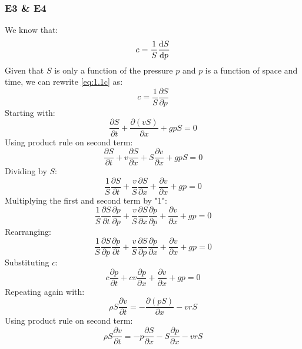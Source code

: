 \documentclass[11pt]{article}
\numberwithin{equation}{section}
\begin{document}
\subsubsection{E3 \& E4}
We know that:
\begin{equation}
    c = \frac{1}{S}\frac{\dif S}{\dif p} \label{eq:1.1c}
\end{equation}
Given that $S$ is only a function of the pressure $p$ and $p$ is a function of space and time, we can rewrite \ref{eq:1.1c} as:
\begin{equation}
    c = \frac{1}{S}\frac{\partial S}{\partial p}
\end{equation}
Starting with:
\begin{equation}
    \frac{\partial S}{\partial t} + \frac{\partial \left(vS\right)}{\partial x} + gpS = 0
\end{equation}
Using product rule on second term:
\begin{equation}
    \frac{\partial S}{\partial t} + v\frac{\partial S}{\partial x} + S \frac{\partial v}{\partial x} + gpS = 0
\end{equation}
Dividing by $S$:
\begin{equation}
    \frac{1}{S}\frac{\partial S}{\partial t} + \frac{v}{S} \frac{\partial S}{\partial x} + \frac{\partial v}{\partial x} + gp = 0
\end{equation}
Multiplying the first and second term by "1":
\begin{equation}
    \frac{1}{S}\frac{\partial S}{\partial t}\frac{\partial p}{\partial p} + \frac{v}{S} \frac{\partial S}{\partial x}\frac{\partial p}{\partial p} + \frac{\partial v}{\partial x} + gp = 0
\end{equation}
Rearranging:
\begin{equation}
    \frac{1}{S}\frac{\partial S}{\partial p}\frac{\partial p}{\partial t} + \frac{v}{S} \frac{\partial S}{\partial p}\frac{\partial p}{\partial x} + \frac{\partial v}{\partial x} + gp = 0
\end{equation}
Substituting $c$:
\begin{equation}
    c \frac{\partial p}{\partial t} + cv\frac{\partial p}{\partial x} + \frac{\partial v}{\partial x} + gp = 0
\end{equation}
Repeating again with:
\begin{equation}
    \rho S \frac{\partial v}{\partial t} = - \frac{\partial \left(pS\right)}{\partial x} - vrS
\end{equation}
Using product rule on second term:
\begin{equation}
    \rho S \frac{\partial v}{\partial t} = - p\frac{\partial S}{\partial x} - S \frac{\partial p}{\partial x} - vrS
\end{equation}
\end{document}

